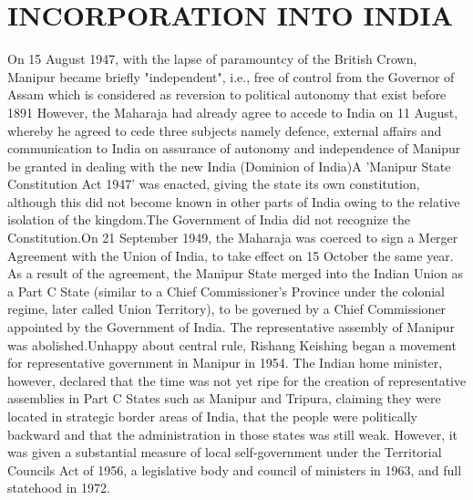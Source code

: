 \documentclass[10pt,a4 paper,two column]{article}
\begin{document}
\section{INCORPORATION INTO INDIA}
On 15 August 1947, with the lapse of paramountcy of the British Crown, Manipur became briefly "independent", i.e., free of control from the Governor of Assam which is considered as reversion to political autonomy that exist before 1891 However, the Maharaja had already agree to accede to India on 11 August, whereby he agreed to cede three subjects namely defence, external affairs and communication to India on assurance of autonomy and independence of Manipur be granted in dealing with the new India (Dominion of India)A 'Manipur State Constitution Act 1947' was enacted, giving the state its own constitution, although this did not become known in other parts of India owing to the relative isolation of the kingdom.The Government of India did not recognize the Constitution.On 21 September 1949, the Maharaja was coerced to sign a Merger Agreement with the Union of India, to take effect on 15 October the same year. As a result of the agreement, the Manipur State merged into the Indian Union as a Part C State (similar to a Chief Commissioner's Province under the colonial regime, later called Union Territory), to be governed by a Chief Commissioner appointed by the Government of India. The representative assembly of Manipur was abolished.Unhappy about central rule, Rishang Keishing began a movement for representative government in Manipur in 1954. The Indian home minister, however, declared that the time was not yet ripe for the creation of representative assemblies in Part C States such as Manipur and Tripura, claiming they were located in strategic border areas of India, that the people were politically backward and that the administration in those states was still weak. However, it was given a substantial measure of local self-government under the Territorial Councils Act of 1956, a legislative body and council of ministers in 1963, and full statehood in 1972.
\end{document}

